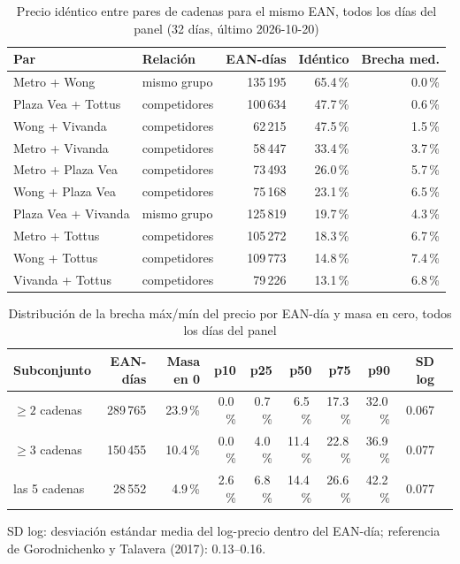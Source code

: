 
\begin{table}[htbp]
\caption{Precio id\'entico entre pares de cadenas para el mismo EAN, todos los d\'ias del panel (32 d\'ias, \'ultimo 2026-10-20)}
\label{tab:identidad}
\centering\scriptsize\setlength{\tabcolsep}{3pt}
\begin{tabular}{@{}llrrr@{}}
\toprule
Par & Relaci\'on & EAN-d\'ias & Id\'entico & Brecha med. \\
\midrule
Metro + Wong & mismo grupo & 135\,195 & 65.4\,\% & 0.0\,\% \\
Plaza Vea + Tottus & competidores & 100\,634 & 47.7\,\% & 0.6\,\% \\
Wong + Vivanda & competidores & 62\,215 & 47.5\,\% & 1.5\,\% \\
Metro + Vivanda & competidores & 58\,447 & 33.4\,\% & 3.7\,\% \\
Metro + Plaza Vea & competidores & 73\,493 & 26.0\,\% & 5.7\,\% \\
Wong + Plaza Vea & competidores & 75\,168 & 23.1\,\% & 6.5\,\% \\
Plaza Vea + Vivanda & mismo grupo & 125\,819 & 19.7\,\% & 4.3\,\% \\
Metro + Tottus & competidores & 105\,272 & 18.3\,\% & 6.7\,\% \\
Wong + Tottus & competidores & 109\,773 & 14.8\,\% & 7.4\,\% \\
Vivanda + Tottus & competidores & 79\,226 & 13.1\,\% & 6.8\,\% \\
\bottomrule\end{tabular}\end{table}

\begin{table}[t]
\caption{Distribuci\'on de la brecha m\'ax/m\'in del precio por EAN-d\'ia y masa en cero, todos los d\'ias del panel}
\label{tab:brecha}
\centering\scriptsize\setlength{\tabcolsep}{4pt}
\begin{tabular}{@{}lrrrrrrrrr@{}}
\toprule
Subconjunto & EAN-d\'ias & Masa en 0 & p10 & p25 & p50 & p75 & p90 & SD log \\
\midrule
$\geq 2$ cadenas & 289\,765 & 23.9\,\% & 0.0\,\% & 0.7\,\% & 6.5\,\% & 17.3\,\% & 32.0\,\% & 0.067 \\
$\geq 3$ cadenas & 150\,455 & 10.4\,\% & 0.0\,\% & 4.0\,\% & 11.4\,\% & 22.8\,\% & 36.9\,\% & 0.077 \\
las 5 cadenas & 28\,552 & 4.9\,\% & 2.6\,\% & 6.8\,\% & 14.4\,\% & 26.6\,\% & 42.2\,\% & 0.077 \\
\bottomrule\end{tabular}
\par\smallskip\raggedright\scriptsize SD log: desviaci\'on est\'andar media del log-precio dentro del EAN-d\'ia; referencia de Gorodnichenko y Talavera (2017): 0.13--0.16.
\end{table}

